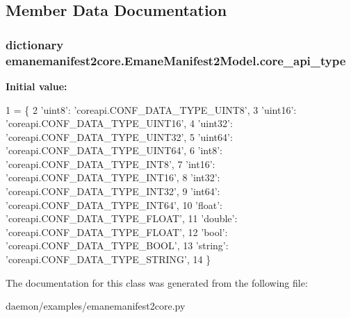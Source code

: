 \subsection{Member Data Documentation}
\hypertarget{classemanemanifest2core_1_1_emane_manifest2_model_ac8fe0209d36afc30a09d9b25a25f0c42}{
\subsubsection[{core\+\_\+api\+\_\+type}]{\setlength{\rightskip}{0pt plus 5cm}dictionary emanemanifest2core.\+Emane\+Manifest2\+Model.\+core\+\_\+api\+\_\+type\hspace{0.3cm}{\ttfamily [static]}}}\label{classemanemanifest2core_1_1_emane_manifest2_model_ac8fe0209d36afc30a09d9b25a25f0c42}
{\bfseries Initial value\+:}
\begin{DoxyCode}
1 = \{
2         \textcolor{stringliteral}{'uint8'}: \textcolor{stringliteral}{'coreapi.CONF\_DATA\_TYPE\_UINT8'},
3         \textcolor{stringliteral}{'uint16'}: \textcolor{stringliteral}{'coreapi.CONF\_DATA\_TYPE\_UINT16'},
4         \textcolor{stringliteral}{'uint32'}: \textcolor{stringliteral}{'coreapi.CONF\_DATA\_TYPE\_UINT32'},
5         \textcolor{stringliteral}{'uint64'}: \textcolor{stringliteral}{'coreapi.CONF\_DATA\_TYPE\_UINT64'},
6         \textcolor{stringliteral}{'int8'}: \textcolor{stringliteral}{'coreapi.CONF\_DATA\_TYPE\_INT8'},
7         \textcolor{stringliteral}{'int16'}: \textcolor{stringliteral}{'coreapi.CONF\_DATA\_TYPE\_INT16'},
8         \textcolor{stringliteral}{'int32'}: \textcolor{stringliteral}{'coreapi.CONF\_DATA\_TYPE\_INT32'},
9         \textcolor{stringliteral}{'int64'}: \textcolor{stringliteral}{'coreapi.CONF\_DATA\_TYPE\_INT64'},
10         \textcolor{stringliteral}{'float'}: \textcolor{stringliteral}{'coreapi.CONF\_DATA\_TYPE\_FLOAT'},
11         \textcolor{stringliteral}{'double'}: \textcolor{stringliteral}{'coreapi.CONF\_DATA\_TYPE\_FLOAT'},
12         \textcolor{stringliteral}{'bool'}: \textcolor{stringliteral}{'coreapi.CONF\_DATA\_TYPE\_BOOL'},
13         \textcolor{stringliteral}{'string'}: \textcolor{stringliteral}{'coreapi.CONF\_DATA\_TYPE\_STRING'},
14     \}
\end{DoxyCode}


The documentation for this class was generated from the following file\+:\begin{DoxyCompactItemize}
\item 
daemon/examples/emanemanifest2core.\+py\end{DoxyCompactItemize}
